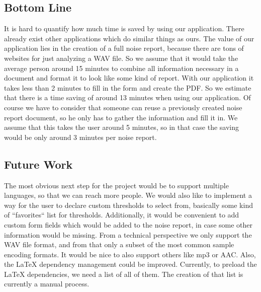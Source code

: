 \subsection{Bottom Line}
It is hard to quantify how much time is saved by using our application. There already exist other applications which do similar things as ours.
The value of our application lies in the creation of a full noise report, because there are tons of websites for just analyzing a WAV file.
So we assume that it would take the average person around 15 minutes to combine all information necessary in a document and format it to look like some kind of report.
With our application it takes less than 2 minutes to fill in the form and create the PDF. So we estimate that there is a time saving of around 13 minutes when using our application. Of course we have to consider that someone can reuse a previously created noise report document, so he only has to gather the information and fill it in. We assume that this takes the user around 5 minutes, so in that case the saving would be only around 3 minutes per noise report.

\subsection{Future Work}
The most obvious next step for the project would be to support multiple languages, so that we can reach more people. We would also like to implement a way
for the user to declare custom thresholds to select from, basically some kind of ``favorites`` list for thresholds. Additionally, it would be convenient to add
custom form fields which would be added to the noise report, in case some other information would be missing. From a technical perspective we only support the WAV
file format, and from that only a subset of the most common sample encoding formats. It would be nice to also support others like mp3 or AAC. Also, the LaTeX dependency
management could be improved. Currently, to preload the LaTeX dependencies, we need a list of all of them. The creation of that list is currently a manual process.